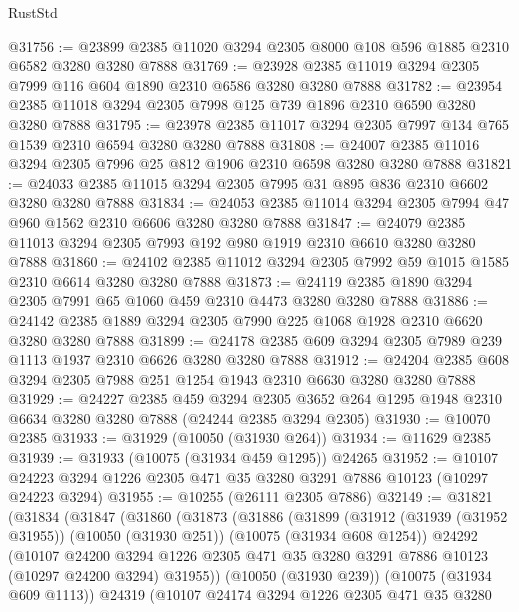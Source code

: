 \begin{lexlean}{RustStd}
\begin{coremodule}
@31756 := @23899 @2385 @11020 @3294 @2305 @8000 @108 @596 @1885 @2310 @6582 @3280 @3280 @7888
@31769 := @23928 @2385 @11019 @3294 @2305 @7999 @116 @604 @1890 @2310 @6586 @3280 @3280 @7888
@31782 := @23954 @2385 @11018 @3294 @2305 @7998 @125 @739 @1896 @2310 @6590 @3280 @3280 @7888
@31795 := @23978 @2385 @11017 @3294 @2305 @7997 @134 @765 @1539 @2310 @6594 @3280 @3280 @7888
@31808 := @24007 @2385 @11016 @3294 @2305 @7996 @25 @812 @1906 @2310 @6598 @3280 @3280 @7888
@31821 := @24033 @2385 @11015 @3294 @2305 @7995 @31 @895 @836 @2310 @6602 @3280 @3280 @7888
@31834 := @24053 @2385 @11014 @3294 @2305 @7994 @47 @960 @1562 @2310 @6606 @3280 @3280 @7888
@31847 := @24079 @2385 @11013 @3294 @2305 @7993 @192 @980 @1919 @2310 @6610 @3280 @3280 @7888
@31860 := @24102 @2385 @11012 @3294 @2305 @7992 @59 @1015 @1585 @2310 @6614 @3280 @3280 @7888
@31873 := @24119 @2385 @1890 @3294 @2305 @7991 @65 @1060 @459 @2310 @4473 @3280 @3280 @7888
@31886 := @24142 @2385 @1889 @3294 @2305 @7990 @225 @1068 @1928 @2310 @6620 @3280 @3280 @7888
@31899 := @24178 @2385 @609 @3294 @2305 @7989 @239 @1113 @1937 @2310 @6626 @3280 @3280 @7888
@31912 := @24204 @2385 @608 @3294 @2305 @7988 @251 @1254 @1943 @2310 @6630 @3280 @3280 @7888
@31929 := @24227
    @2385
    @459
    @3294
    @2305
    @3652
    @264
    @1295
    @1948
    @2310
    @6634
    @3280
    @3280
    @7888
    (@24244 @2385 @3294 @2305)
@31930 := @10070 @2385
@31933 := @31929 (@10050 (@31930 @264))
@31934 := @11629 @2385
@31939 := @31933 (@10075 (@31934 @459 @1295)) @24265
@31952 := @10107 @24223 @3294 @1226 @2305 @471 @35 @3280 @3291 @7886 @10123 (@10297 @24223 @3294)
@31955 := @10255 (@26111 @2305 @7886)
@32149 := @31821
    (@31834
      (@31847
        (@31860
          (@31873
            (@31886
              (@31899
                (@31912
                  (@31939 (@31952 @31955))
                  (@10050 (@31930 @251))
                  (@10075 (@31934 @608 @1254))
                  @24292
                  (@10107
                    @24200
                    @3294
                    @1226
                    @2305
                    @471
                    @35
                    @3280
                    @3291
                    @7886
                    @10123
                    (@10297 @24200 @3294)
                    @31955))
                (@10050 (@31930 @239))
                (@10075 (@31934 @609 @1113))
                @24319
                (@10107
                  @24174
                  @3294
                  @1226
                  @2305
                  @471
                  @35
                  @3280

\end{coremodule}
\end{lexlean}
